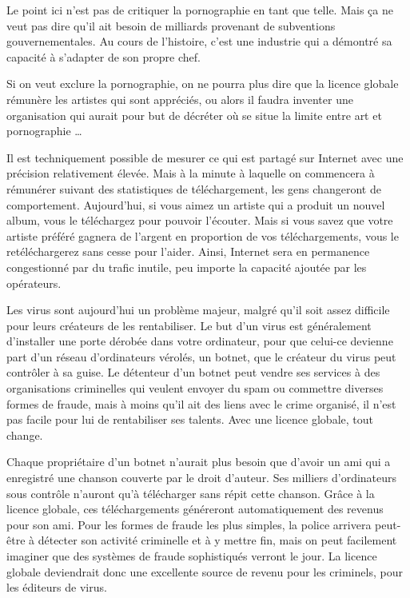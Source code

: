 Le point ici n'est pas de critiquer la pornographie en tant que telle.
Mais ça ne veut pas dire qu'il ait besoin de milliards provenant de subventions gouvernementales.
Au cours de l'histoire, c'est une industrie qui a démontré sa capacité à s'adapter de son propre chef.

Si on veut exclure la pornographie, on ne pourra plus dire que la licence globale rémunère les artistes qui sont appréciés, ou alors il faudra inventer une organisation qui aurait pour but de décréter où se situe la limite entre art et pornographie \dots{}

Il est techniquement possible de mesurer ce qui est partagé sur Internet avec une précision relativement élevée.
Mais à la minute à laquelle on commencera à rémunérer suivant des statistiques de téléchargement, les gens changeront de comportement.
Aujourd'hui, si vous aimez un artiste qui a produit un nouvel album, vous le téléchargez pour pouvoir l'écouter.
Mais si vous savez que votre artiste préféré gagnera de l'argent en proportion de vos téléchargements, vous le retéléchargerez sans cesse pour l'aider.
Ainsi, Internet sera en permanence congestionné par du trafic inutile, peu importe la capacité ajoutée par les opérateurs.

Les virus sont aujourd'hui un problème majeur, malgré qu'il soit assez difficile pour leurs créateurs de les rentabiliser.
Le but d'un virus est généralement d'installer une porte dérobée dans votre ordinateur, pour que celui-ce devienne part d'un réseau d'ordinateurs vérolés, un botnet, que le créateur du virus peut contrôler à sa guise.
Le détenteur d'un botnet peut vendre ses services à des organisations criminelles qui veulent envoyer du spam ou commettre diverses formes de fraude, mais à moins qu'il ait des liens avec le crime organisé, il n'est pas facile pour lui de rentabiliser ses talents.
Avec une licence globale, tout change.

Chaque propriétaire d'un botnet n'aurait plus besoin que d'avoir un ami qui a enregistré une chanson couverte par le droit d'auteur.
Ses milliers d'ordinateurs sous contrôle n'auront qu'à télécharger sans répit cette chanson.
Grâce à la licence globale, ces téléchargements généreront automatiquement des revenus pour son ami.
Pour les formes de fraude les plus simples, la police arrivera peut-être à détecter son activité criminelle et à y mettre fin, mais on peut facilement imaginer que des systèmes de fraude sophistiqués verront le jour.
La licence globale deviendrait donc une excellente source de revenu pour les criminels, pour les éditeurs de virus.

